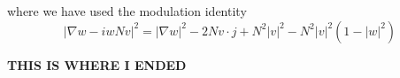 \documentclass[a4paper]{article}
\renewcommand{\div}{\mathrm{div}}
\newlength{\horizspace}
\newlength{\smallspace}
\begin{document}

where we have used the modulation identity
\begin{equation}
  | \nabla w - i w N v |^2 = | \nabla w |^2 - 2 N v \cdot j + N^2 |v|^2 - N^2 |v|^2 ( 1 - |w|^2 )
  \label{eq:mod_identity}
\end{equation}

{\Large{\textbf{THIS IS WHERE I ENDED}}}
\end{document}
